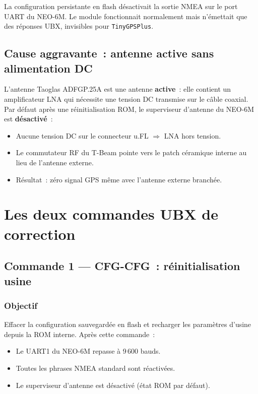 \documentclass[12pt,a4paper]{article}
\newcommand{\code}[1]{\texttt{#1}}
\begin{document}
\begin{errorbox}[title=Cause identifi\'ee]
La configuration persistante en flash d\'esactivait la sortie NMEA sur le
port UART du NEO-6M. Le module fonctionnait normalement mais n'\'emettait que
des r\'eponses UBX, invisibles pour \code{TinyGPSPlus}.
\end{errorbox}

\subsection{Cause aggravante~: antenne active sans alimentation DC}

L'antenne Taoglas ADFGP.25A est une antenne \textbf{active}~: elle contient
un amplificateur LNA qui n\'ecessite une tension DC transmise sur le c\^able
coaxial. Par d\'efaut apr\`es une r\'einitialisation ROM, le superviseur
d'antenne du NEO-6M est \textbf{d\'esactiv\'e}~:

\begin{itemize}
  \item Aucune tension DC sur le connecteur u.FL $\Rightarrow$ LNA hors tension.
  \item Le commutateur RF du T-Beam pointe vers le patch c\'eramique interne
        au lieu de l'antenne externe.
  \item R\'esultat~: z\'ero signal GPS m\^eme avec l'antenne externe branch\'ee.
\end{itemize}

\section{Les deux commandes UBX de correction}

\subsection{Commande 1 --- CFG-CFG~: r\'einitialisation usine}

\subsubsection{Objectif}

Effacer la configuration sauvegard\'ee en flash et recharger les param\`etres
d'usine depuis la ROM interne. Apr\`es cette commande~:

\begin{itemize}
  \item Le UART1 du NEO-6M repasse \`a 9\,600 bauds.
  \item Toutes les phrases NMEA standard sont r\'eactiv\'ees.
  \item Le superviseur d'antenne est d\'esactiv\'e (\'etat ROM par d\'efaut).
\end{itemize}
\end{document}
